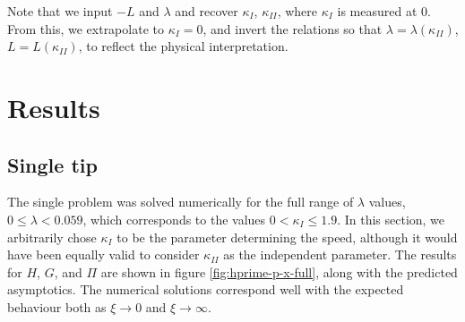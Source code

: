 \documentclass{jfm}
\begin{document}
Note that we input $-L$ and $\lambda$ and recover $\kappa_I$, $\kappa_{II}$, where 
$\kappa_I$ is measured at $0$. From this, we extrapolate to $\kappa_I =0$, and
invert the relations so that $\lambda = \lambda(\kappa_{II})$, 
$L = L(\kappa_{II})$, to reflect the physical interpretation.

%
%
% 
\section{Results}\label{sec:Results}
%
%
%
\subsection{Single tip}
The single problem was solved numerically for the full range of $\lambda$ 
values, $0 \leq \lambda < 0.059$, which corresponds to the values $0 < 
\kappa_I \leq 1.9$. In this section, we arbitrarily chose $\kappa_I$ to be the 
parameter determining the speed, although it would have been equally valid to 
consider $\kappa_{II}$ as the independent parameter. The results for $H$, $G$, 
and $\Pi$ are shown in figure \ref{fig:hprime-p-x-full}, along with the 
predicted asymptotics. The numerical solutions correspond well with the 
expected behaviour both as $\xi \to 0$ and $\xi \to \infty$.
\end{document}
